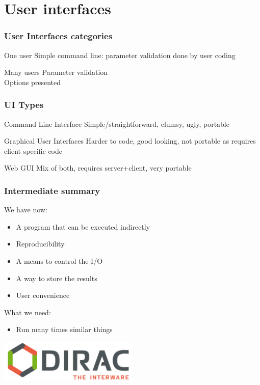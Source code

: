 \documentclass[14pt]{beamer}
\begin{document}
\section{User interfaces}
\begin{frame}
\frametitle{User Interfaces categories}
\begin{block}{One user}
Simple command line: parameter validation done by user coding
\end{block}
\pause
\begin{block}{Many users}
Parameter validation\\
Options presented
\end{block}
\end{frame}

\begin{frame}
\frametitle{UI Types}
\begin{block}{Command Line Interface}
Simple/straightforward, clumsy, ugly, portable
\end{block}
\pause
\begin{block}{Graphical User Interfaces}
Harder to code, good looking, not portable as requires client specific code
\end{block}
\pause
\begin{block}{Web GUI}
Mix of both, requires server+client, very portable
\end{block}
\end{frame}

\begin{frame}
\frametitle{Intermediate summary}
We have now:
\begin{itemize}
\item A program that can be executed indirectly
\item Reproducibility
\item A means to control the I/O
\item A way to store the results
\item User convenience
\end{itemize}
What we need:
\begin{itemize}
\item Run many times similar things
\end{itemize}

\centering
\includegraphics[width=0.5\textwidth]{Dirac_logo_RGB.png}

\end{frame}
\end{document}
